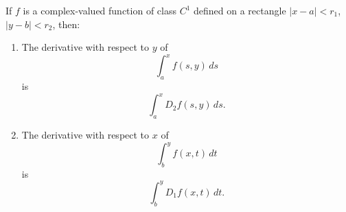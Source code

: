 If $f$ is a complex-valued function of class $C^1$ defined on a rectangle $|x - a| < r_1$, $|y - b| < r_2$, then:
\begin{enumerate}
\item The derivative with respect to $y$ of
$$
\int_a^x f(s, y) \, ds
$$
is
$$
\int_a^x D_2 f(s, y) \, ds.
$$
\item The derivative with respect to $x$ of
$$
\int_b^y f(x, t) \, dt
$$
is
$$
\int_b^y D_1 f(x, t) \, dt.
$$
\end{enumerate}
